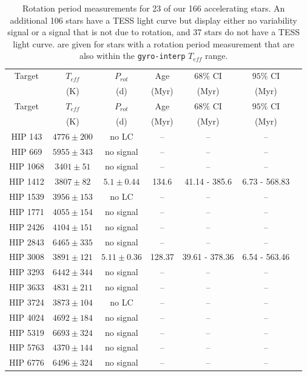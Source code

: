 \begin{longtable}{|c|c|c|c|c|c|c|}

\caption{Rotation period measurements for 23 of our 166 accelerating stars. An additional 106 stars have a TESS light curve but display either no variability signal or a signal that is not due to rotation, and 37 stars do not have a TESS light curve.  are given for stars with a rotation period measurement that are also within the \texttt{gyro-interp} $T_{eff}$ range.}\\


\hline
Target & $T_{eff}$  & $P_{rot}$  & Age & $68\%$ CI & $95\%$ CI  \\
& (K)& (d) &  (Myr) & (Myr) & (Myr) \\
\hline
\endfirsthead
\hline
Target & $T_{eff}$  & $P_{rot}$  & Age & $68\%$ CI & $95\%$ CI  \\
& (K)&  (d) &  (Myr) & (Myr) & (Myr) \\
\hline
\endhead
\hline
\endfoot
\hline
\endlastfoot
HIP 143 & $ 4776 \pm 200 $ & no LC &-- &-- &-- \\
HIP 669 & $ 5955 \pm 343 $ & no signal &-- &-- &-- \\
HIP 1068 & $ 3401 \pm 51 $ & no signal &-- &-- &-- \\
HIP 1412 & $ 3807 \pm 82 $ &$ 5.1 \pm 0.44 $ & 134.6 & 41.14 - 385.6 & 6.73 - 568.83 \\
HIP 1539 & $ 3956 \pm 153 $ & no LC &-- &-- &-- \\
HIP 1771 & $ 4055 \pm 154 $ & no signal &-- &-- &-- \\
HIP 2426 & $ 4104 \pm 151 $ & no signal &-- &-- &-- \\
HIP 2843 & $ 6465 \pm 335 $ & no signal &-- &-- &-- \\
HIP 3008 & $ 3891 \pm 121 $ &$ 5.11 \pm 0.36 $ & 128.37 & 39.61 - 378.36 & 6.54 - 563.46 \\
HIP 3293 & $ 6442 \pm 344 $ & no signal &-- &-- &-- \\
HIP 3633 & $ 4831 \pm 211 $ & no signal &-- &-- &-- \\
HIP 3724 & $ 3873 \pm 104 $ & no LC &-- &-- &-- \\
HIP 4024 & $ 4692 \pm 184 $ & no signal &-- &-- &-- \\
HIP 5319 & $ 6693 \pm 324 $ & no signal &-- &-- &-- \\
HIP 5763 & $ 4370 \pm 144 $ & no signal &-- &-- &-- \\
HIP 6776 & $ 6496 \pm 324 $ & no signal &-- &-- &-- \\

\end{longtable}
